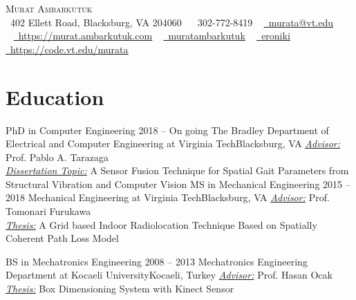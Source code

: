 \documentclass[letterpaper,11pt]{article}
\begin{document}
\nocite{ambarkutuk2022sensor}
\nocite{ambarkutuk2021uncertainty}
\nocite{sa2021investigation}
\nocite{sa2020towards}
\nocite{ambarkutuk2017grid}
\nocite{ocak2015image}
\nocite{guner2015meslek}
\nocite{guner2014distance}
\nocite{guner2013magnetic}

\begin{center}
    {\Huge \scshape Murat Ambarkutuk} \\ \vspace{1pt}
    \faHome~402 Ellett Road, Blacksburg, VA 204060
	~ \small \raisebox{-0.1\height}\faPhone\ 302-772-8419
	~ \href{mailto:murata@vt.edu}{\raisebox{-0.2\height}\faEnvelope\  \underline{murata@vt.edu}} \\
	~ \href{https://murat.ambarkutuk.com}{\raisebox{-0.2\height}\faBookmark\  \underline{https://murat.ambarkutuk.com}} 
    ~ \href{https://linkedin.com/in/muratambarkutuk/}{\raisebox{-0.2\height}\faLinkedin\ \underline{muratambarkutuk}}
	~ \href{https://github.com/eroniki}{\raisebox{-0.2\height}\faGithub\ \underline{eroniki}}
	~ \href{https://code.vt.edu/murata}{\raisebox{-0.2\height}\faGitlab\ \underline{https://code.vt.edu/murata}}
	\vspace{-8pt}
\end{center}

\section{Education}
  \resumeSubHeadingListStart
    \resumeSubheading
      {PhD in Computer Engineering}
	  {2018 -- On going}
      {The Bradley Department of Electrical and Computer Engineering at Virginia Tech}{Blacksburg, VA}
	  \textit{\underline{Advisor:}} Prof. Pablo A. Tarazaga \\
	  \textit{\underline{Dissertation Topic:}} A Sensor Fusion Technique for Spatial Gait Parameters from Structural Vibration and Computer Vision 
	  \resumeSubheading
      {MS in Mechanical Engineering}
	  {2015 -- 2018}
      {Mechanical Engineering at Virginia Tech}{Blacksburg, VA}
	  \textit{\underline{Advisor:}} Prof. Tomonari Furukawa \\
	  \textit{\underline{Thesis:}} A Grid based Indoor Radiolocation Technique Based on Spatially Coherent Path Loss Model
	  
	  \resumeSubheading
      {BS in Mechatronics Engineering}
	  {2008 -- 2013}
      {Mechatronics Engineering Department at Kocaeli University}{Kocaeli, Turkey}
	  \textit{\underline{Advisor:}} Prof. Hasan Ocak \\
	  \textit{\underline{Thesis:}} Box Dimensioning System with Kinect Sensor
  \resumeSubHeadingListEnd
\end{document}
